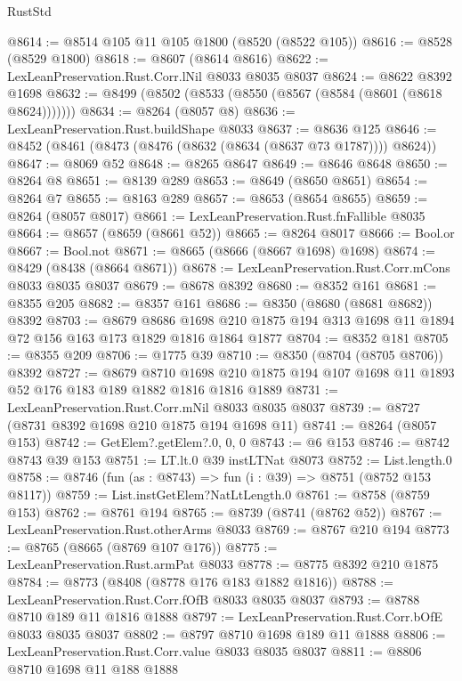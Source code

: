 \begin{lexlean}{RustStd}
\begin{coremodule}
@8614 := @8514 @105 @11 @105 @1800 (@8520 (@8522 @105))
@8616 := @8528 (@8529 @1800)
@8618 := @8607 (@8614 @8616)
@8622 := LexLeanPreservation.Rust.Corr.lNil @8033 @8035 @8037
@8624 := @8622 @8392 @1698
@8632 := @8499 (@8502 (@8533 (@8550 (@8567 (@8584 (@8601 (@8618 @8624)))))))
@8634 := @8264 (@8057 @8)
@8636 := LexLeanPreservation.Rust.buildShape @8033
@8637 := @8636 @125
@8646 := @8452 (@8461 (@8473 (@8476 (@8632 (@8634 (@8637 @73 @1787)))) @8624))
@8647 := @8069 @52
@8648 := @8265 @8647
@8649 := @8646 @8648
@8650 := @8264 @8
@8651 := @8139 @289
@8653 := @8649 (@8650 @8651)
@8654 := @8264 @7
@8655 := @8163 @289
@8657 := @8653 (@8654 @8655)
@8659 := @8264 (@8057 @8017)
@8661 := LexLeanPreservation.Rust.fnFallible @8035
@8664 := @8657 (@8659 (@8661 @52))
@8665 := @8264 @8017
@8666 := Bool.or
@8667 := Bool.not
@8671 := @8665 (@8666 (@8667 @1698) @1698)
@8674 := @8429 (@8438 (@8664 @8671))
@8678 := LexLeanPreservation.Rust.Corr.mCons @8033 @8035 @8037
@8679 := @8678 @8392
@8680 := @8352 @161
@8681 := @8355 @205
@8682 := @8357 @161
@8686 := @8350 (@8680 (@8681 @8682)) @8392
@8703 := @8679
    @8686
    @1698
    @210
    @1875
    @194
    @313
    @1698
    @11
    @1894
    @72
    @156
    @163
    @173
    @1829
    @1816
    @1864
    @1877
@8704 := @8352 @181
@8705 := @8355 @209
@8706 := @1775 @39
@8710 := @8350 (@8704 (@8705 @8706)) @8392
@8727 := @8679
    @8710
    @1698
    @210
    @1875
    @194
    @107
    @1698
    @11
    @1893
    @52
    @176
    @183
    @189
    @1882
    @1816
    @1816
    @1889
@8731 := LexLeanPreservation.Rust.Corr.mNil @8033 @8035 @8037
@8739 := @8727 (@8731 @8392 @1698 @210 @1875 @194 @1698 @11)
@8741 := @8264 (@8057 @153)
@8742 := GetElem?.getElem?.{0, 0, 0}
@8743 := @6 @153
@8746 := @8742 @8743 @39 @153
@8751 := LT.lt.{0} @39 instLTNat @8073
@8752 := List.length.{0}
@8758 := @8746 (fun (as : @8743) => fun (i : @39) => @8751 (@8752 @153 @8117))
@8759 := List.instGetElem?NatLtLength.{0}
@8761 := @8758 (@8759 @153)
@8762 := @8761 @194
@8765 := @8739 (@8741 (@8762 @52))
@8767 := LexLeanPreservation.Rust.otherArms @8033
@8769 := @8767 @210 @194
@8773 := @8765 (@8665 (@8769 @107 @176))
@8775 := LexLeanPreservation.Rust.armPat @8033
@8778 := @8775 @8392 @210 @1875
@8784 := @8773 (@8408 (@8778 @176 @183 @1882 @1816))
@8788 := LexLeanPreservation.Rust.Corr.fOfB @8033 @8035 @8037
@8793 := @8788 @8710 @189 @11 @1816 @1888
@8797 := LexLeanPreservation.Rust.Corr.bOfE @8033 @8035 @8037
@8802 := @8797 @8710 @1698 @189 @11 @1888
@8806 := LexLeanPreservation.Rust.Corr.value @8033 @8035 @8037
@8811 := @8806 @8710 @1698 @11 @188 @1888

\end{coremodule}
\end{lexlean}
